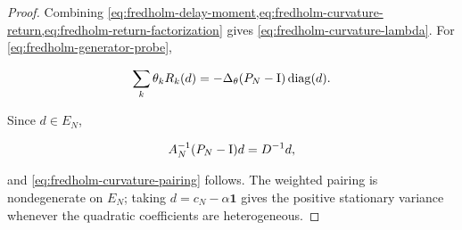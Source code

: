 \begin{proof}
Combining
\cref{eq:fredholm-delay-moment,eq:fredholm-curvature-return,eq:fredholm-return-factorization}
gives
\cref{eq:fredholm-curvature-lambda}.  For
\cref{eq:fredholm-generator-probe},

\[
 \sum_k\theta_kR_k(d)
 =-\Delta_\theta(P_N-\mathrm I)\operatorname{diag}(d).
\]

Since \(d\in E_N\),

\[
 A_N^{-1}(P_N-\mathrm I)d=D^{-1}d,
\]

and \cref{eq:fredholm-curvature-pairing} follows.  The weighted pairing is
nondegenerate on \(E_N\); taking \(d=c_N-\alpha\mathbf1\) gives the positive
stationary variance whenever the quadratic coefficients are heterogeneous.
\end{proof}
